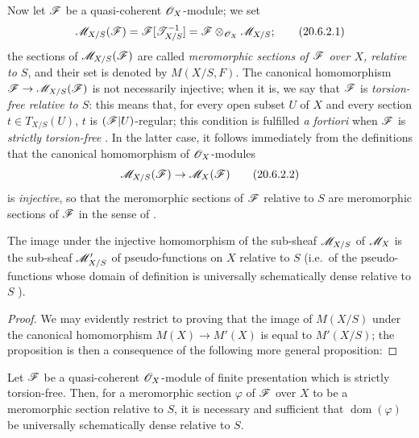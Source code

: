 \begin{env}[20.6.2]\label{IV.20.6.2}
Now let $\mathscr{F}$ be a quasi-coherent $\mathscr{O}_X$-module; we set
\[
\label{IV.20.6.2.1}
  \mathscr{M}_{X/S}(\mathscr{F})=\mathscr{F}[\mathscr{T}_{X/S}^{-1}]=\mathscr{F}\otimes_{\mathscr{O}_X}\mathscr{M}_{X/S};
  \tag{20.6.2.1}
\]
the sections of $\mathscr{M}_{X/S}(\mathscr{F})$ are called \emph{meromorphic sections of $\mathscr{F}$ over $X$, relative to $S$}, and their set is denoted by $M(X/S,F)$.
The canonical homomorphism $\mathscr{F}\to\mathscr{M}_{X/S}(\mathscr{F})$ is not necessarily injective; when it is, we say that $\mathscr{F}$ is \emph{torsion-free relative to $S$}: this means that, for every open subset $U$ of $X$ and every section $t\in T_{X/S}(U)$, $t$ is $(\mathscr{F}|U)$-regular; this condition is fulfilled \emph{a fortiori} when $\mathscr{F}$ is \emph{strictly torsion-free} .
In the latter case, it follows immediately from the definitions  that the canonical homomorphism of $\mathscr{O}_X$-modules
\[
\label{IV.20.6.2.2}
  \mathscr{M}_{X/S}(\mathscr{F})\to\mathscr{M}_X(\mathscr{F})
  \tag{20.6.2.2}
\]
is \emph{injective}, so that the meromorphic sections of $\mathscr{F}$ relative to $S$ are meromorphic sections of $\mathscr{F}$ in the sense of .
\end{env}

\begin{proposition}[20.6.3]
\label{IV.20.6.3}
The image under the injective homomorphism  of the sub-sheaf $\mathscr{M}_{X/S}$ of $\mathscr{M}_X$ is the sub-sheaf $\mathscr{M}'_{X/S}$ of pseudo-functions on $X$ relative to $S$ (i.e.\ of the pseudo-functions whose domain of definition is universally schematically dense relative to $S$ ).
\end{proposition}

\begin{proof}
We may evidently restrict to proving that the image of $M(X/S)$ under the canonical homomorphism $M(X)\to M'(X)$ is equal to $M'(X/S)$; the proposition is then a consequence of the following more general proposition:
\end{proof}

\begin{proposition}[20.6.4]
\label{IV.20.6.4}
Let $\mathscr{F}$ be a quasi-coherent $\mathscr{O}_X$-module of finite presentation which is strictly torsion-free.
Then, for a meromorphic section $\varphi$ of $\mathscr{F}$ over $X$ to be a meromorphic section relative to $S$, it is necessary and sufficient that $\operatorname{dom}(\varphi)$ be universally schematically dense relative to $S$.
\end{proposition}

